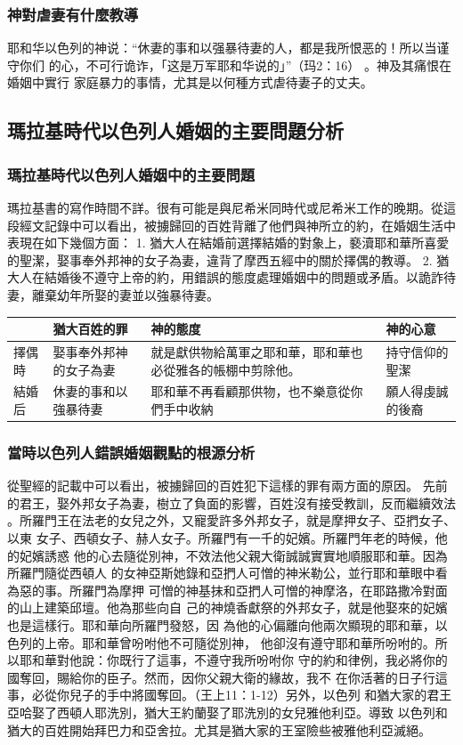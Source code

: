 \subsubsection{神對虐妻有什麼教導} 
耶和华以色列的神说：“休妻的事和以强暴待妻的人，都是我所恨恶的！所以当谨守你们
的心，不可行诡诈，「这是万军耶和华说的」”（玛2：16） 。神及其痛恨在婚姻中實行
家庭暴力的事情，尤其是以何種方式虐待妻子的丈夫。

\subsection{瑪拉基時代以色列人婚姻的主要問題分析}

\subsubsection{瑪拉基時代以色列人婚姻中的主要問題}
瑪拉基書的寫作時間不詳。很有可能是與尼希米同時代或尼希米工作的晚期。從這段經文記錄中可以看出，被擄歸回的百姓背離了他們與神所立的約，在婚姻生活中表現在如下幾個方面：
1. 猶大人在結婚前選擇結婚的對象上，褻瀆耶和華所喜愛的聖潔，娶事奉外邦神的女子為妻，違背了摩西五經中的關於擇偶的教導。
2. 猶大人在結婚後不遵守上帝的約，用錯誤的態度處理婚姻中的問題或矛盾。以詭詐待妻，離棄幼年所娶的妻並以強暴待妻。 


\begin{table}[H]
\centering
\begin{tabular}{p{4em}|p{10em}|p{20em}|p{14em}}  \toprule
&猶大百姓的罪&神的態度&神的心意\\  \midrule
擇偶時&娶事奉外邦神的女子為妻&就是獻供物給萬軍之耶和華，耶和華也必從雅各的帳棚中剪除他。&持守信仰的聖潔\\  \midrule
結婚后&休妻的事和以強暴待妻&耶和華不再看顧那供物，也不樂意從你們手中收納&願人得虔誠的後裔\\  \midrule
\end{tabular}
\end{table}


\subsubsection{當時以色列人錯誤婚姻觀點的根源分析}
從聖經的記載中可以看出，被擄歸回的百姓犯下這樣的罪有兩方面的原因。
先前的君王，娶外邦女子為妻，樹立了負面的影響，百姓沒有接受教訓，反而繼續效法
。所羅門王在法老的女兒之外，又寵愛許多外邦女子，就是摩押女子、亞捫女子、以東
女子、西頓女子、赫人女子。所羅門有一千的妃嬪。所羅門年老的時候，他的妃嬪誘惑
他的心去隨從別神，不效法他父親大衛誠誠實實地順服耶和華。因為所羅門隨從西頓人
的女神亞斯她錄和亞捫人可憎的神米勒公，並行耶和華眼中看為惡的事。所羅門為摩押
可憎的神基抹和亞捫人可憎的神摩洛，在耶路撒冷對面的山上建築邱壇。他為那些向自
己的神燒香獻祭的外邦女子，就是他娶來的妃嬪也是這樣行。耶和華向所羅門發怒，因
為他的心偏離向他兩次顯現的耶和華，以色列的上帝。耶和華曾吩咐他不可隨從別神，
他卻沒有遵守耶和華所吩咐的。所以耶和華對他說：你既行了這事，不遵守我所吩咐你
守的約和律例，我必將你的國奪回，賜給你的臣子。然而，因你父親大衛的緣故，我不
在你活著的日子行這事，必從你兒子的手中將國奪回。（王上11：1-12）另外，以色列
和猶大家的君王亞哈娶了西頓人耶洗別，猶大王約蘭娶了耶洗別的女兒雅他利亞。導致
以色列和猶大的百姓開始拜巴力和亞舍拉。尤其是猶大家的王室險些被雅他利亞滅絕。

